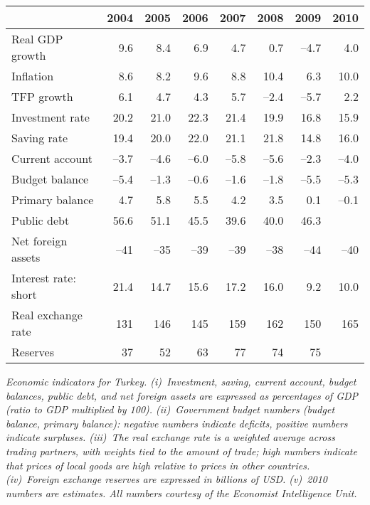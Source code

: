 \documentclass[letterpaper,12pt]{exam}
\begin{document}
\begin{questions}
\begin{center}
\begin{tabular}{lrrrrrrr}
\toprule 
         &  2004  &  2005  &  2006   & 2007  & 2008 &  2009  &  2010 \\%
\midrule 
Real GDP growth  & 9.6 & 8.4 & 6.9 & 4.7 & 0.7 & --4.7 & 4.0 \\
Inflation   & 8.6 & 8.2 & 9.6 & 8.8 & 10.4 & 6.3 & 10.0 \\
TFP growth  & 6.1 & 4.7 & 4.3 & 5.7 & --2.4 & --5.7 & 2.2 \\ 
Investment rate & 20.2 & 21.0 & 22.3 & 21.4 & 19.9 & 16.8 & 15.9 \\
Saving rate     & 19.4 & 20.0 & 22.0 & 21.1 & 21.8 & 14.8 & 16.0 \\
Current account & --3.7 & --4.6 & --6.0 & --5.8 & --5.6 & --2.3 & --4.0 \\
Budget balance  & --5.4 & --1.3 & --0.6 & --1.6 & --1.8 & --5.5 & --5.3 \\ 
Primary balance & 4.7 & 5.8 & 5.5 & 4.2 & 3.5 & 0.1 & --0.1 \\
Public debt      & 56.6 & 51.1 & 45.5 & 39.6 & 40.0 & 46.3 \\
Net foreign assets   & --41 & --35 & --39 & --39 & --38 & --44 & --40 \\%
Interest rate:  short & 21.4 & 14.7 & 15.6 & 17.2 & 16.0 & 9.2 & 10.0\\
Real exchange rate & 131 & 146 & 145 & 159 & 162 & 150 & 165 \\
Reserves           &  37 & 52 & 63 & 77 & 74 & 75 \\
\bottomrule 
\end{tabular}
\end{center}
{\it 
Economic indicators for Turkey.  
(i)~Investment, saving, current account, budget balances, 
public debt, and net foreign assets are expressed as 
percentages of GDP (ratio to GDP multiplied by 100).  
(ii)~Government budget numbers (budget balance, primary balance): 
negative numbers indicate deficits, 
positive numbers indicate surpluses.  
(iii)~The real exchange rate is a weighted average across trading partners, 
with weights tied to the amount of trade;
high numbers indicate that prices of local goods are high relative to 
prices in other countries.
(iv)~Foreign exchange reserves are expressed in billions of USD.  
(v)~2010 numbers are estimates.
All numbers courtesy of the Economist Intelligence Unit.} 


\end{questions}
\end{document}
